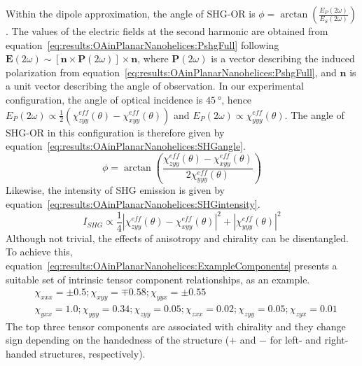 Within the dipole approximation, the angle of SHG-OR is $\phi=\arctan{\left(\frac{E_P\left(2\omega\right)}{E_S\left(2\omega\right)}\right)}$. 
The values of the electric fields at the second harmonic are obtained from equation~\ref{eq:results:OAinPlanarNanohelices:PshgFull} following $\mathbf{E}(2\omega)\sim[\mathbf{n}\times\mathbf{P}(2\omega)]\times\mathbf{n}$, where $\mathbf{P}(2\omega)$ is a vector describing the induced polarization from equation~\ref{eq:results:OAinPlanarNanohelices:PshgFull}, and $\mathbf{n}$ is a unit vector describing the angle of observation. 
In our experimental configuration, the angle of optical incidence is $\SI{45}{\degree}$, hence $E_P(2\omega)\propto\frac{1}{2}(\chi_{zyy}^{eff}(\theta)-\chi_{xyy}^{eff}(\theta))$ and $E_P(2\omega)\propto\chi_{yyy}^{eff}(\theta)$. 
The angle of SHG-OR in this configuration is therefore given by equation~\ref{eq:results:OAinPlanarNanohelices:SHGangle}.
\begin{equation}\label{eq:results:OAinPlanarNanohelices:SHGangle}
	\phi  = \arctan \left({\frac{\chi_{zyy}^{eff}(\theta) - \chi _{xyy}^{eff}(\theta)}{2\chi _{yyy}^{eff}(\theta)}}\right)
\end{equation}
Likewise, the intensity of SHG emission is given by equation~\ref{eq:results:OAinPlanarNanohelices:SHGintensity}.
\begin{equation}\label{eq:results:OAinPlanarNanohelices:SHGintensity}
	I_{SHG} \propto \frac{1}{4}{\left| {\chi _{zyy}^{eff}\left( \theta  \right) - \chi _{xyy}^{eff}\left( \theta  \right)} \right|^2} + {\left| {\chi _{yyy}^{eff}\left( \theta  \right)} \right|^2}
\end{equation}
Although not trivial, the effects of anisotropy and chirality can be disentangled. To achieve this, equation~\ref{eq:results:OAinPlanarNanohelices:ExampleComponents} presents a suitable set of intrinsic tensor component relationships, as an example.
\begin{equation}\label{eq:results:OAinPlanarNanohelices:ExampleComponents}
	\begin{split}
		& \chi_{xxx} = \pm 0.5; \chi_{xyy} = \mp0.58; \chi_{yyx} = \pm 0.55 \\
		& \chi _{yxx} = 1.0; \chi _{yyy} = 0.34; \chi _{zyy} = 0.05; \chi _{zxx} = 0.02; \chi_{zyy} = 0.05; \chi _{zyx} = 0.01
	\end{split}
\end{equation}
The top three tensor components are associated with chirality and they change sign depending on the handedness of the structure ($+$ and $-$ for left- and right-handed structures, respectively). 
